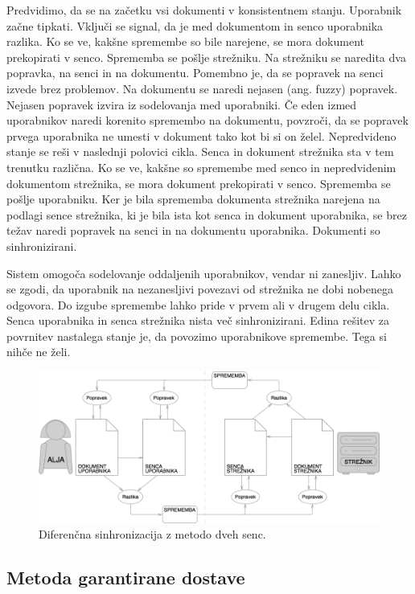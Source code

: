 \documentclass[a4paper, 12pt, twoside]{book}
\begin{document}
Predvidimo, da se na začetku vsi dokumenti v konsistentnem stanju. Uporabnik začne tipkati. Vključi se signal, da je med dokumentom in senco uporabnika razlika. Ko se ve, kakšne spremembe so bile narejene, se mora dokument prekopirati v senco. Sprememba se pošlje strežniku. Na strežniku se naredita dva popravka, na senci in na dokumentu. Pomembno je, da se popravek na senci izvede brez problemov. Na dokumentu se naredi nejasen (ang. fuzzy) popravek. Nejasen popravek izvira iz sodelovanja med uporabniki. Če eden izmed uporabnikov naredi korenito spremembo na dokumentu, povzroči, da se popravek prvega uporabnika ne umesti v dokument tako kot bi si on želel. Nepredvideno stanje se reši v naslednji polovici cikla. Senca in dokument strežnika sta v tem trenutku različna. Ko se ve, kakšne so spremembe med senco in nepredvidenim dokumentom strežnika, se mora dokument prekopirati v senco. Sprememba se pošlje uporabniku. Ker je bila sprememba dokumenta strežnika narejena na podlagi sence strežnika, ki je bila ista kot senca in dokument uporabnika, se brez težav naredi popravek na senci in na dokumentu uporabnika. Dokumenti so sinhronizirani.

Sistem omogoča sodelovanje oddaljenih uporabnikov, vendar ni zanesljiv. Lahko se zgodi, da uporabnik na nezanesljivi povezavi od strežnika ne dobi nobenega odgovora. Do izgube spremembe lahko pride v prvem ali v drugem delu cikla. Senca uporabnika in senca strežnika nista več sinhronizirani. Edina rešitev za povrnitev nastalega stanje je, da povozimo uporabnikove spremembe. Tega si nihče ne želi.

\begin{figure}[placement h]
\begin{center}
\includegraphics[width=11.83cm]{ds2.png}
\end{center}
\caption{Diferenčna sinhronizacija z metodo dveh senc.}
\label{ds2}
\end{figure}

\subsection{Metoda garantirane dostave}
\end{document}
